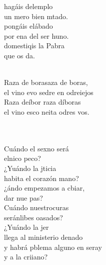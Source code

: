 \documentclass[12pt]{article}
\begin{document}
\begin{multicols*}{2}
\begin{cancion}%
	 hagáis delemplo\\
	un mero bien mtado.\\
	 pongáis elábado\\
	por ena del ser huno.\\
	 domestiqis la Pabra \\
	que os da.\\\jump\\
	\begin{chorus}%
	Raza de borasaza de boras, \\
	el vino evo sedre en odreiejos\\
	Raza deíbor raza díboras\\
	el vino esco neita odres vos.\\
	\end{chorus}%
	\jump\\
	    \\
	Cuándo el sexno será\\
	elnico peco?\\
	¿Yuándo la jticia \\
	habita el corazón mano?\\
	¿ándo empezamos a cbiar,\\
	dar nue pas?\\
	Cuándo nuestrocuras\\
	seránlibes oasados? \\
	¿Yuándo la jer \\
	llega al ministerio denado\\
	y  habrá pblema alguno en seray\\
	y a la  criiano?\\\jump\\

\end{cancion}
\end{multicols*}
\end{document}
